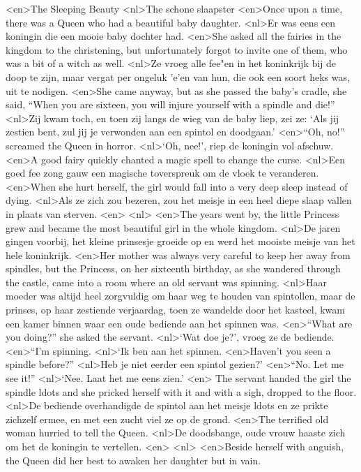 <en>The Sleeping Beauty
<nl>The schone slaapster
<en>Once upon a time, there was a Queen who had a beautiful baby daughter.
<nl>Er was eens een koningin die een mooie baby dochter had. 
<en>She asked all the fairies in the kingdom to the christening, but unfortunately forgot to invite one of them, who was a bit of a witch as well.
<nl>Ze vroeg alle fee"en in het koninkrijk bij de doop te zijn, maar vergat per ongeluk 'e'en van hun, die ook een soort heks was,  uit te nodigen. 
<en>She came anyway, but as she passed the baby’s cradle, she said, “When you are sixteen, you will injure yourself with a spindle and die!” 
<nl>Zij kwam toch, en toen zij langs de wieg van de baby liep, zei ze: `Als jij zestien bent, zul jij je verwonden aan een spintol en doodgaan.'
<en>“Oh, no!” screamed the Queen in horror.
<nl>`Oh, nee!', riep de koningin vol afschuw.
<en>A good fairy quickly chanted a magic spell to change the curse.
<nl>Een goed fee zong gauw een magische toverspreuk om de vloek te veranderen. 
<en>When she hurt herself, the girl would fall into a very deep sleep instead of dying.
<nl>Als ze zich zou bezeren, zou het meisje in een heel diepe slaap vallen in plaats van sterven.
<en>
<nl>
<en>The years went by, the little Princess grew and became the most beautiful girl in the whole kingdom.
<nl>De jaren gingen voorbij, het kleine prinsesje groeide op en werd het mooiste meisje van het hele koninkrijk.
<en>Her mother was always very careful to keep her away from spindles, but the Princess, on her sixteenth birthday, as she wandered through the castle, came into a room where an old servant was spinning.
<nl>Haar moeder was altijd heel zorgvuldig om haar weg te houden van spintollen, maar de prinses, op haar zestiende verjaardag, toen ze wandelde door het kasteel, kwam een kamer binnen waar een oude bediende aan het spinnen was.
<en>“What are you doing?” she asked the servant.
<nl>`Wat doe je?', vroeg ze de bediende.
<en>“I’m spinning.
<nl>`Ik ben aan het spinnen.
<en>Haven’t you seen a spindle before?”
<nl>Heb je niet eerder een spintol gezien?'
<en>“No. Let me see it!”
<nl>`Nee. Laat het me eens zien.'
<en> The servant handed the girl the spindle ldots and she pricked herself with it and with a sigh, dropped to the floor.
<nl>De bediende overhandigde de spintol aan het meisje ldots en ze prikte zichzelf ermee, en met een zucht viel ze op de grond.
<en>The terrified old woman hurried to tell the Queen.
<nl>De doodsbange, oude vrouw haaste zich om het de koningin te vertellen.
<en>
<nl>
<en>Beside herself with anguish, the Queen did her best to awaken her daughter but in vain.
